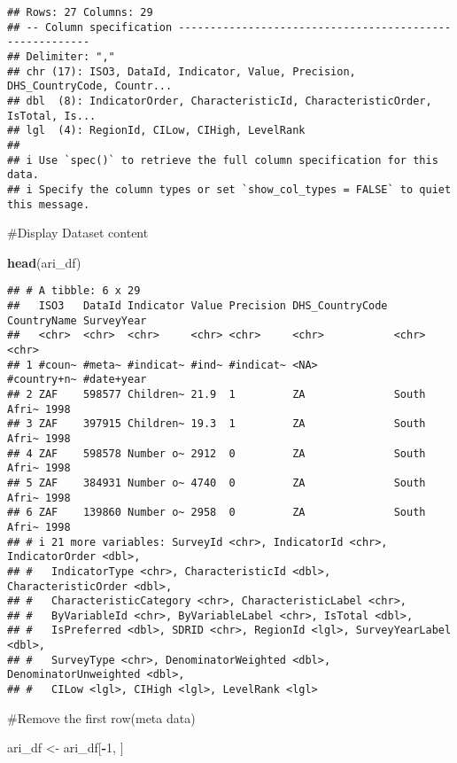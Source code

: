 \documentclass[
]{article}
\newenvironment{Shaded}{\begin{snugshade}}{\end{snugshade}}
\newcommand{\DecValTok}[1]{\textcolor[rgb]{0.00,0.00,0.81}{#1}}
\newcommand{\FunctionTok}[1]{\textcolor[rgb]{0.13,0.29,0.53}{\textbf{#1}}}
\newcommand{\NormalTok}[1]{#1}
\newcommand{\OtherTok}[1]{\textcolor[rgb]{0.56,0.35,0.01}{#1}}
\newcommand{\SpecialCharTok}[1]{\textcolor[rgb]{0.81,0.36,0.00}{\textbf{#1}}}
\begin{document}
\begin{verbatim}
## Rows: 27 Columns: 29
## -- Column specification --------------------------------------------------------
## Delimiter: ","
## chr (17): ISO3, DataId, Indicator, Value, Precision, DHS_CountryCode, Countr...
## dbl  (8): IndicatorOrder, CharacteristicId, CharacteristicOrder, IsTotal, Is...
## lgl  (4): RegionId, CILow, CIHigh, LevelRank
## 
## i Use `spec()` to retrieve the full column specification for this data.
## i Specify the column types or set `show_col_types = FALSE` to quiet this message.
\end{verbatim}

\#Display Dataset content

\begin{Shaded}
\begin{Highlighting}[]
\FunctionTok{head}\NormalTok{(ari\_df)}
\end{Highlighting}
\end{Shaded}

\begin{verbatim}
## # A tibble: 6 x 29
##   ISO3   DataId Indicator Value Precision DHS_CountryCode CountryName SurveyYear
##   <chr>  <chr>  <chr>     <chr> <chr>     <chr>           <chr>       <chr>     
## 1 #coun~ #meta~ #indicat~ #ind~ #indicat~ <NA>            #country+n~ #date+year
## 2 ZAF    598577 Children~ 21.9  1         ZA              South Afri~ 1998      
## 3 ZAF    397915 Children~ 19.3  1         ZA              South Afri~ 1998      
## 4 ZAF    598578 Number o~ 2912  0         ZA              South Afri~ 1998      
## 5 ZAF    384931 Number o~ 4740  0         ZA              South Afri~ 1998      
## 6 ZAF    139860 Number o~ 2958  0         ZA              South Afri~ 1998      
## # i 21 more variables: SurveyId <chr>, IndicatorId <chr>, IndicatorOrder <dbl>,
## #   IndicatorType <chr>, CharacteristicId <dbl>, CharacteristicOrder <dbl>,
## #   CharacteristicCategory <chr>, CharacteristicLabel <chr>,
## #   ByVariableId <chr>, ByVariableLabel <chr>, IsTotal <dbl>,
## #   IsPreferred <dbl>, SDRID <chr>, RegionId <lgl>, SurveyYearLabel <dbl>,
## #   SurveyType <chr>, DenominatorWeighted <dbl>, DenominatorUnweighted <dbl>,
## #   CILow <lgl>, CIHigh <lgl>, LevelRank <lgl>
\end{verbatim}

\#Remove the first row(meta data)

\begin{Shaded}
\begin{Highlighting}[]
\NormalTok{ari\_df }\OtherTok{\textless{}{-}}\NormalTok{ ari\_df[}\SpecialCharTok{{-}}\DecValTok{1}\NormalTok{, ]}
\end{Highlighting}
\end{Shaded}
\end{document}
